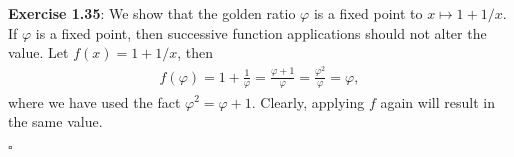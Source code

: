 \documentclass[11pt]{article}
\date{\today}
\title{}
\begin{document}
\noindent\textbf{Exercise 1.35}: We show that the golden ratio $\varphi$ is a fixed point to $x \mapsto 1 + 1/x$.
If $\varphi$ is a fixed point, then successive function applications should not alter the value.
Let $f(x) = 1 + 1/x$, then
\begin{align*}
  f(\varphi) = 1 + \frac{1}{\varphi} = \frac{\varphi + 1}{\varphi} = \frac{\varphi^2}{\varphi} = \varphi,
\end{align*}
where we have used the fact $\varphi^2 = \varphi + 1$.
Clearly, applying $f$ again will result in the same value.

\hfill$\square$
\end{document}
